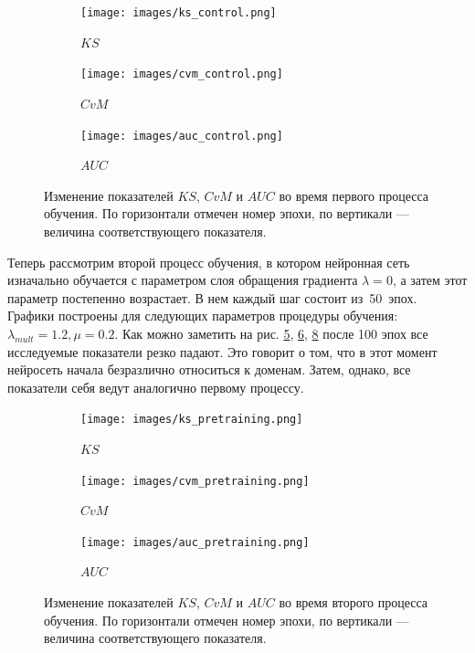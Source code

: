 \documentclass[14pt, a4paper]{extarticle}
\begin{document}
\begin{figure}[!h]
\begin{subfigure}{.5\textwidth}
    \centering
	\texttt{[image: images/ks\_control.png]}
	\caption{$KS$}
	\label{figure:control_results_ks}
\end{subfigure}
\begin{subfigure}{.5\textwidth}
	\centering
	\texttt{[image: images/cvm\_control.png]}
	\caption{$CvM$}
	\label{figure:control_results_cvm}
\end{subfigure}
\begin{subfigure}{.5\textwidth}
	\centering
	\texttt{[image: images/auc\_control.png]}
	\caption{$AUC$}
	\label{figure:control_results_auc}
\end{subfigure}
\caption{Изменение показателей $KS$, $CvM$ и $AUC$ во время первого процесса обучения.
По горизонтали отмечен номер эпохи, по вертикали — величина соответствующего показателя.}
\end{figure}

Теперь рассмотрим второй процесс обучения, в котором нейронная сеть изначально обучается с параметром слоя обращения градиента $\lambda = 0$, а затем этот параметр постепенно возрастает. В нем каждый шаг состоит из~50~эпох. Графики построены для следующих параметров процедуры обучения: $\lambda_{mult} = 1.2, \mu = 0.2$. Как можно заметить на рис. \ref{figure:pretraining_results_ks}, \ref{figure:pretraining_results_cvm}, \ref{figure:pretraining_results_auc} после 100 эпох все исследуемые показатели резко падают. Это говорит о том, что в этот момент нейросеть начала безразлично относиться к доменам. Затем, однако, все показатели себя ведут аналогично первому процессу.

\begin{figure}[!h]
\begin{subfigure}{.5\textwidth}
	\centering
	\texttt{[image: images/ks\_pretraining.png]}
	\caption{$KS$}
	\label{figure:pretraining_results_ks}
\end{subfigure}
\begin{subfigure}{.5\textwidth}
	\centering
	\texttt{[image: images/cvm\_pretraining.png]}
	\caption{$CvM$}
	\label{figure:pretraining_results_cvm}
\end{subfigure}
\begin{subfigure}{.5\textwidth}
	\centering
	\texttt{[image: images/auc\_pretraining.png]}
	\caption{$AUC$}
	\label{figure:pretraining_results_auc}
\end{subfigure}
\caption{Изменение показателей $KS$, $CvM$ и $AUC$ во время второго процесса обучения.
По горизонтали отмечен номер эпохи, по вертикали — величина соответствующего показателя.}
\end{figure}
\end{document}
